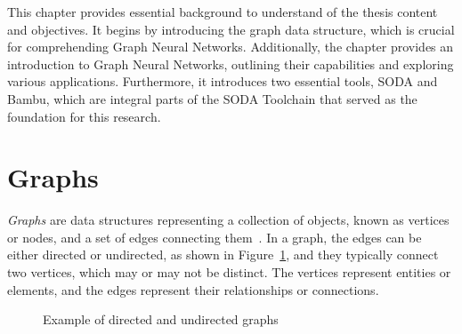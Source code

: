 This chapter provides essential background to understand of the thesis content and objectives.
It begins by introducing the graph data structure, which is crucial for comprehending Graph Neural Networks.
Additionally, the chapter provides an introduction to Graph Neural Networks, outlining their capabilities and exploring various applications.
Furthermore, it introduces two essential tools, SODA and Bambu, which are integral parts of the SODA Toolchain that served as the foundation for this research.

\section{Graphs}
\label{sec:graphs}%

\textit{Graphs} are data structures representing a collection of objects, known as vertices or nodes, and a set of edges connecting them~\cite{DBLP:journals/corr/abs-1812-08434}.
In a graph, the edges can be either directed or undirected, as shown in Figure~\ref{fig:directed_vs_undirected}, and they typically connect two vertices, which may or may not be distinct.
The vertices represent entities or elements, and the edges represent their relationships or connections.

\begin{figure}[b]
    \centering
    \hspace{0.15\textwidth}
    \caption{Example of directed and undirected graphs}
    \label{fig:directed_vs_undirected}
\end{figure}

